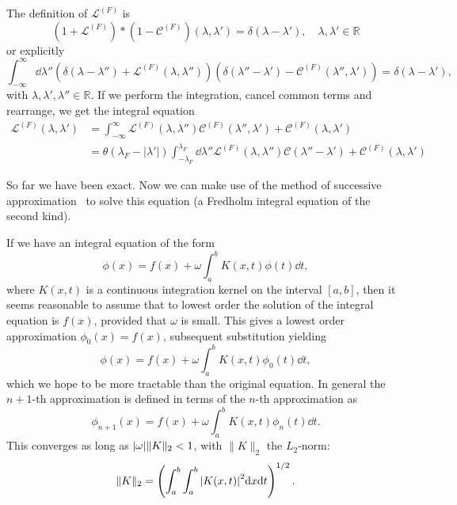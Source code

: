 \documentclass[11pt, a4paper]{report} %
\newcommand{\inversetruncc}{\mathcal{L}}
\newcommand{\kernel}{\mathcal{C}}
\begin{document}
The definition of \(\inversetruncc^{(F)}\) is~\cite{tofind}
\begin{equation}
	\left(1 + \inversetruncc^{(F)}\right) * \left(1 - \kernel^{(F)}\right)(\lambda,\lambda')=\delta(\lambda-\lambda'), \quad \lambda, \lambda' \in \mathbb{R}
\end{equation}
or explicitly
\begin{equation}
	\int_{-\infty}^{\infty} \dd \lambda'' \left( \delta(\lambda-\lambda'') + \inversetruncc^{(F)}(\lambda,\lambda'')\right)\left(\delta(\lambda''-\lambda') - \kernel^{(F)}(\lambda'',\lambda')\right) = \delta(\lambda-\lambda'),
\end{equation}
with  \(\lambda, \lambda', \lambda'' \in \mathbb{R}\).
If we perform the integration, cancel common terms and rearrange, we get the integral equation
\begin{align}
	\inversetruncc^{(F)}(\lambda,\lambda') &= \int_{-\infty}^{\infty} \inversetruncc^{(F)}(\lambda,\lambda'') \kernel^{(F)}(\lambda'',\lambda') + \kernel^{(F)}(\lambda,\lambda')\\
	&= \theta(\lambda_F - \lvert\lambda'\rvert) \int_{-\lambda_F}^{\lambda_F} \dd \lambda'' \inversetruncc^{(F)}(\lambda,\lambda'') \kernel(\lambda''-\lambda') + \kernel^{(F)}(\lambda,\lambda')
\end{align}

So far we have been exact.
Now we can make use of the method of successive approximation~\cite{Zemyan2012} to solve this equation (a Fredholm integral equation of the second kind).

If we have an integral equation of the form
\begin{equation}
  \phi(x) = f(x) + \omega \int_{a}^b K(x,t)\phi(t) \dd t,
\end{equation}
where $K(x,t)$ is a continuous integration kernel on the interval $[a,b]$, then it seems reasonable to assume that to lowest order the solution of the integral equation is $f(x)$, provided that $\omega$ is small.
This gives a lowest order approximation $\phi_0(x) = f(x)$, subsequent substitution yielding 
\begin{equation}
  \phi(x) = f(x) + \omega \int_{a}^b K(x,t)\phi_0(t) \dd t,
\end{equation}
which we hope to be more tractable than the original equation.
In general the $n+1$-th approximation is defined in terms of the $n$-th approximation as
\begin{equation}
  \phi_{n+1}(x) = f(x) + \omega \int_{a}^b K(x,t)\phi_n(t) \dd t.
\end{equation}
This converges as long as $\abs{\omega} \lVert K \rVert_2 < 1$, with $\lVert K \rVert_2$ the $L_2$-norm:
\begin{equation}
  \lVert K \rVert_2 = \left( \int_{a}^b \int_a^b \abs{K(x,t)}^2 \dd x \dd t\right)^{1/2}.
\end{equation}
\end{document}
